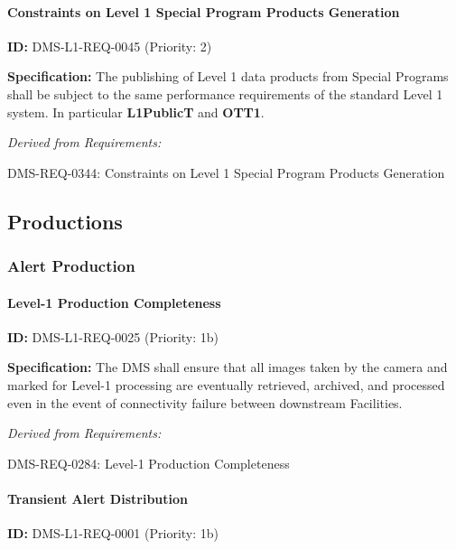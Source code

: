 \documentclass[SE,toc,lsstdraft]{lsstdoc}
\begin{document}
\paragraph{Constraints on Level 1 Special Program Products Generation}\hfill  %

\label{DMS-L1-REQ-0045}
\textbf{ID:} DMS-L1-REQ-0045 (Priority: 2)

\textbf{Specification: }The publishing of Level 1 data products from Special Programs shall be subject to the same performance requirements of the standard Level 1 system. In particular \textbf{L1PublicT} and \textbf{OTT1}.

\emph{Derived from Requirements:}

DMS-REQ-0344:
Constraints on Level 1 Special Program Products Generation \newline

\subsection{Productions}

\subsubsection{Alert Production}

\paragraph{Level-1 Production Completeness}\hfill  %

\label{DMS-L1-REQ-0025}
\textbf{ID:} DMS-L1-REQ-0025 (Priority: 1b)

\textbf{Specification:} The DMS shall ensure that all images taken by the camera and marked for Level-1 processing are eventually retrieved, archived, and processed even in the event of connectivity failure between downstream Facilities.

\emph{Derived from Requirements:}

DMS-REQ-0284:
Level-1 Production Completeness \newline

\paragraph{Transient Alert Distribution}\hfill  %

\label{DMS-L1-REQ-0001}
\textbf{ID:} DMS-L1-REQ-0001 (Priority: 1b)
\end{document}
